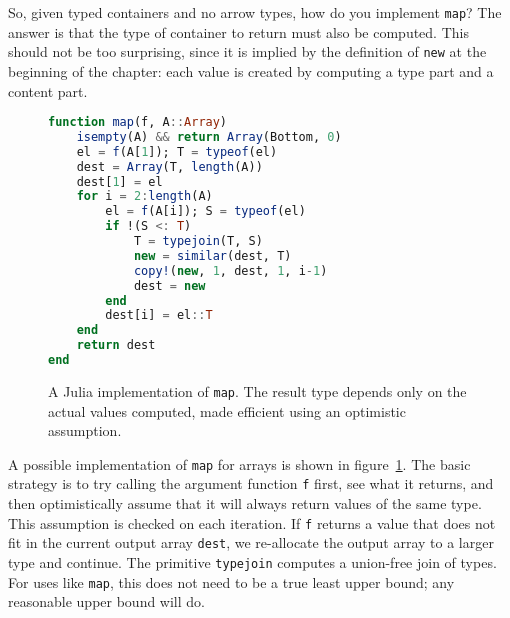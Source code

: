 So, given typed containers and no arrow types, how do you implement
\texttt{map}? The answer is that the type of container to return must
also be computed. This should not be too surprising, since it is implied by
the definition of \texttt{new} at the beginning of the chapter: each
value is created by computing a type part and a content part.

\begin{singlespace}
\begin{figure}
\begin{lstlisting}[language=julia]
function map(f, A::Array)
    isempty(A) && return Array(Bottom, 0)
    el = f(A[1]); T = typeof(el)
    dest = Array(T, length(A))
    dest[1] = el
    for i = 2:length(A)
        el = f(A[i]); S = typeof(el)
        if !(S <: T)
            T = typejoin(T, S)
            new = similar(dest, T)
            copy!(new, 1, dest, 1, i-1)
            dest = new
        end
        dest[i] = el::T
    end
    return dest
end
\end{lstlisting}
  \caption[An implementation of \texttt{map}]{
    A Julia implementation of \texttt{map}.
    The result type depends only on the actual values computed, made
    efficient using an optimistic assumption.
  }
  \label{fig:mapimpl}
\end{figure}
\end{singlespace}

A possible implementation of \texttt{map} for arrays is shown in
figure~\ref{fig:mapimpl}.
The basic strategy is to try calling the argument function \texttt{f}
first, see what it returns, and then optimistically assume that it
will always return values of the same type.
This assumption is checked on each iteration.
If \texttt{f} returns a value that does not fit in the current output
array \texttt{dest}, we re-allocate the output array to a larger
type and continue.
The primitive \texttt{typejoin} computes a union-free join of types.
For uses like \texttt{map}, this does not need to be a true least
upper bound; any reasonable upper bound will do.

